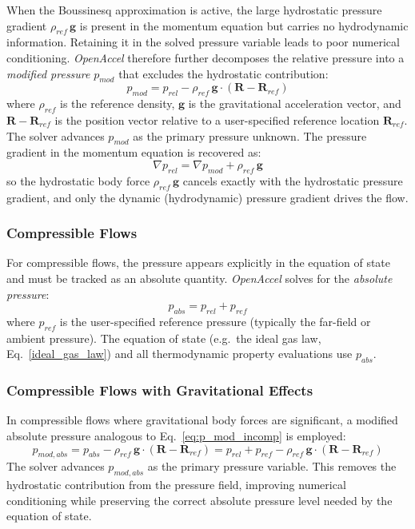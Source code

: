 \documentclass[12pt]{extarticle}
\newcommand{\<}{\langle}
\renewcommand{\>}{\rangle}
\theoremstyle{definition}
\begin{document}
When the Boussinesq approximation is active, the large hydrostatic pressure gradient $\rho_{ref}\,\textbf{g}$ is present in the momentum equation but carries no hydrodynamic information. Retaining it in the solved pressure variable leads to poor numerical conditioning. \textit{OpenAccel} therefore further decomposes the relative pressure into a \textit{modified pressure} $p_{mod}$ that excludes the hydrostatic contribution:
\begin{equation}\label{eq:p_mod_incomp}
    p_{mod} = p_{rel} - \rho_{ref}\,\textbf{g} \cdot \left(\textbf{R} - \textbf{R}_{ref}\right)
\end{equation}
where $\rho_{ref}$ is the reference density, $\textbf{g}$ is the gravitational acceleration vector, and $\textbf{R} - \textbf{R}_{ref}$ is the position vector relative to a user-specified reference location $\textbf{R}_{ref}$. The solver advances $p_{mod}$ as the primary pressure unknown. The pressure gradient in the momentum equation is recovered as:
\begin{equation}
    \nabla p_{rel} = \nabla p_{mod} + \rho_{ref}\,\textbf{g}
\end{equation}
so the hydrostatic body force $\rho_{ref}\,\textbf{g}$ cancels exactly with the hydrostatic pressure gradient, and only the dynamic (hydrodynamic) pressure gradient drives the flow.

\subsubsection{Compressible Flows}

For compressible flows, the pressure appears explicitly in the equation of state and must be tracked as an absolute quantity. \textit{OpenAccel} solves for the \textit{absolute pressure}:
\begin{equation}
    p_{abs} = p_{rel} + p_{ref}
\end{equation}
where $p_{ref}$ is the user-specified reference pressure (typically the far-field or ambient pressure). The equation of state (e.g.\ the ideal gas law, Eq.~\ref{ideal_gas_law}) and all thermodynamic property evaluations use $p_{abs}$.

\subsubsection{Compressible Flows with Gravitational Effects}

In compressible flows where gravitational body forces are significant, a modified absolute pressure analogous to Eq.~\eqref{eq:p_mod_incomp} is employed:
\begin{equation}
    p_{mod,abs} = p_{abs} - \rho_{ref}\,\textbf{g} \cdot \left(\textbf{R} - \textbf{R}_{ref}\right) = p_{rel} + p_{ref} - \rho_{ref}\,\textbf{g} \cdot \left(\textbf{R} - \textbf{R}_{ref}\right)
\end{equation}
The solver advances $p_{mod,abs}$ as the primary pressure variable. This removes the hydrostatic contribution from the pressure field, improving numerical conditioning while preserving the correct absolute pressure level needed by the equation of state.
\end{document}
